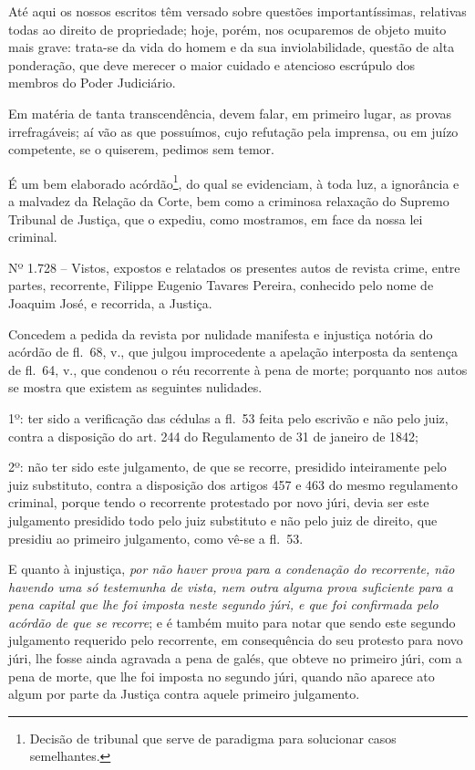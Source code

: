 Até aqui os nossos escritos têm versado sobre questões importantíssimas,
relativas todas ao direito de propriedade; hoje, porém, nos ocuparemos
de objeto muito mais grave: trata-se da vida do homem e da sua
inviolabilidade, questão de alta ponderação, que deve merecer o maior
cuidado e atencioso escrúpulo dos membros do Poder Judiciário.

Em matéria de tanta transcendência, devem falar, em primeiro lugar, as
provas irrefragáveis; aí vão as que possuímos, cujo refutação pela
imprensa, ou em juízo competente, se o quiserem, pedimos sem temor.

É um bem elaborado acórdão\footnote{Decisão de tribunal que serve de
  paradigma para solucionar casos semelhantes.}, do qual se evidenciam,
à toda luz, a ignorância e a malvadez da Relação da Corte, bem como a
criminosa relaxação do Supremo Tribunal de Justiça, que o expediu, como
mostramos, em face da nossa lei criminal.

Nº 1.728 -- Vistos, expostos e relatados os presentes autos de revista
crime, entre partes, recorrente, Filippe Eugenio Tavares Pereira,
conhecido pelo nome de Joaquim José, e recorrida, a Justiça.

Concedem a pedida da revista por nulidade manifesta e injustiça notória
do acórdão de fl.~68, v., que julgou improcedente a apelação interposta
da sentença de fl.~64, v., que condenou o réu recorrente à pena de
morte; porquanto nos autos se mostra que existem as seguintes nulidades.

1º: ter sido a verificação das cédulas a fl.~53 feita pelo escrivão e
não pelo juiz, contra a disposição do art. 244 do Regulamento de 31 de
janeiro de 1842;

2º: não ter sido este julgamento, de que se recorre, presidido
inteiramente pelo juiz substituto, contra a disposição dos artigos 457 e
463 do mesmo regulamento criminal, porque tendo o recorrente protestado
por novo júri, devia ser este julgamento presidido todo pelo juiz
substituto e não pelo juiz de direito, que presidiu ao primeiro
julgamento, como vê-se a fl.~53.

E quanto à injustiça, \emph{por não haver prova para a condenação do
recorrente, não havendo uma só testemunha de vista, nem outra alguma
prova suficiente para a pena capital que lhe foi imposta neste segundo
júri, e que foi confirmada pelo acórdão de que se recorre}; e é também
muito para notar que sendo este segundo julgamento requerido pelo
recorrente, em consequência do seu protesto para novo júri, lhe fosse
ainda agravada a pena de galés, que obteve no primeiro júri, com a pena
de morte, que lhe foi imposta no segundo júri, quando não aparece ato
algum por parte da Justiça contra aquele primeiro julgamento.

